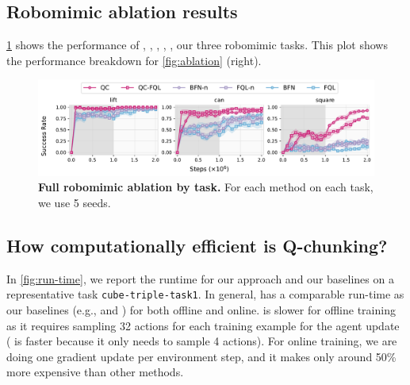 \subsection{Robomimic ablation results}
\cref{fig:full-robomimic} shows the performance of , , , , ,  our three robomimic tasks. This plot shows the performance breakdown for \cref{fig:ablation} (right).
\begin{figure}[H]
    \centering
\includegraphics[width=\linewidth]{figures/robomimic-all.pdf}
    \caption{\textbf{Full robomimic ablation by task.} For each method on each task, we use 5 seeds.}
    \label{fig:full-robomimic}
\end{figure}

\subsection{How computationally efficient is Q-chunking?}
In \cref{fig:run-time}, we report the runtime for our approach and our baselines on a representative task \texttt{cube-triple-task1}. In general,  has a comparable run-time as our baselines (e.g.,  and ) for both offline and online.  is slower for offline training as it requires sampling 32 actions for each training example for the agent update ( is faster because it only needs to sample 4 actions). For online training, we are doing one gradient update per environment step, and it makes  only around 50\% more expensive than other methods.

